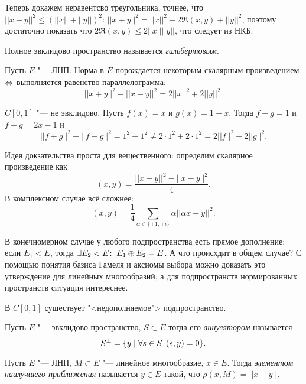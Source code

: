 \documentclass[main]{subfiles}
\begin{document}
Теперь докажем неравентсво треугольника, точнее, что
\( ||x + y||^2 \le (||x|| + ||y||)^2 \):
\( ||x + y||^2 = ||x||^2 + 2 \Re(x, y) + ||y||^2 \),
поэтому достаточно показать что \( 2 \Re(x, y) \le 2 ||x|| ||y|| \),
что следует из НКБ.

\begin{definition}
  Полное эвклидово пространство называется \emph{гильбертовым}.
\end{definition}

\begin{theorem}[б/д]
  Пусть \( E \) "--- ЛНП. Норма в \( E \) порождается некоторым
  скалярным произведением \( \Leftrightarrow \) выполняется равенство
  параллелограмма:
  \[ ||x + y||^2 + ||x - y||^2 = 2||x||^2 + 2||y||^2. \]
\end{theorem}

\begin{example}
  \( C[0, 1] \) "--- не эвклидово. Пусть \( f(x) = x \) и \( g(x) = 1 - x \).
  Тогда \( f + g = 1 \) и \( f - g = 2x - 1 \) и
  \[ ||f + g||^2 + ||f - g||^2 = 1^2 + 1^2 \ne 2 \cdot 1^2 + 2 \cdot 1^2 =
  2 ||f||^2 + 2||g||^2. \]
\end{example}

Идея докзательства проста для вещественного:
определим скалярное произведение как
\[ (x, y) = \frac{||x + y||^2 - ||x - y||^2}{4}. \]
В комплексном случае всё сложнее:
\[ (x, y) = \frac{1}{4} \sum_{\alpha \in \{ \pm 1, \pm i \}}
\alpha ||\alpha x + y||^2. \]

В конечномерном случае у любого подпространства есть прямое дополнение:
если \( E_1 < E \), тогда \( \exists E_2 < E \colon \: E_1 \oplus E_2 = E \).
А что происхдит в общем случае? С помощью понятия базиса Гамеля и аксиомы выбора
можно доказать это утверждение для линейных многообразий,
а для подпространств нормированных пространств ситуация интереснее.

\begin{problem}
  В \( C[0, 1] \) существует "<недополняемое"> подпространство.
\end{problem}

\begin{definition}
  Пусть \( E \) "--- эвклидово пространство, \( S \subset E \)
  тогда его \emph{аннулятором} называется
  \[ S^\perp = \{ y \mid \forall {s \in S} \; \, (s, y) = 0 \}. \]
\end{definition}

\begin{definition}
  Пусть \( E \) "--- ЛНП, \( M \subset E \) "--- линейное многообразие,
  \( x \in E \). Тогда \emph{элементом наилучшего приближения} называется
  \( y \in E \) такой, что \( \rho(x, M) = ||x - y|| \).
\end{definition}
\end{document}
